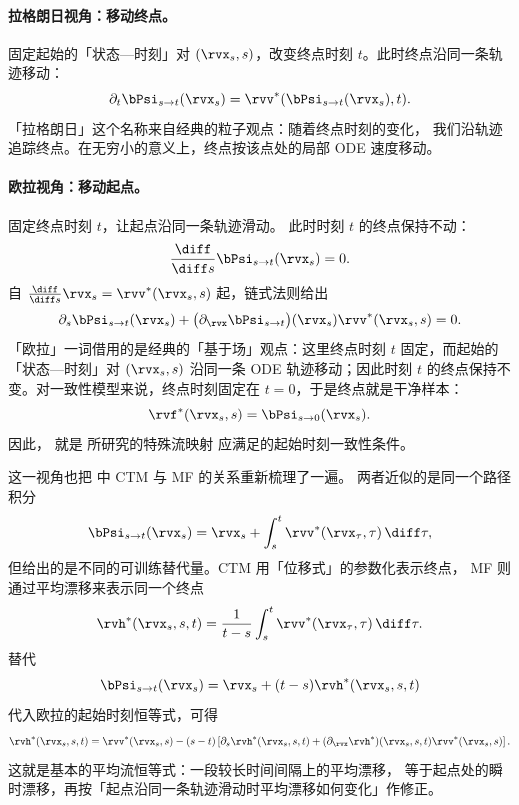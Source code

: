 \paragraph{拉格朗日视角：移动终点。}
固定起始的「状态—时刻」对 $(\rvx_s,s)$，改变终点时刻
$t$。此时终点沿同一条轨迹移动：
\[
\partial_t \bPsi_{s\to t}(\rvx_s)
=
\rvv^*(\bPsi_{s\to t}(\rvx_s),t).
\]
「拉格朗日」这个名称来自经典的粒子观点：随着终点时刻的变化，
我们沿轨迹追踪终点。在无穷小的意义上，终点按该点处的局部 ODE 速度移动。

\paragraph{欧拉视角：移动起点。}
固定终点时刻 $t$，让起点沿同一条轨迹滑动。
此时时刻 $t$ 的终点保持不动：
\[
\frac{\diff}{\diff s}\bPsi_{s\to t}(\rvx_s)=0.
\]
自 $\frac{\diff}{\diff s}\rvx_s=\rvv^*(\rvx_s,s)$ 起，链式法则给出
\[
\partial_s\bPsi_{s\to t}(\rvx_s)
+
\big(\partial_{\rvx}\bPsi_{s\to t}\big)(\rvx_s)\rvv^*(\rvx_s,s)
=
0.
\]
「欧拉」一词借用的是经典的「基于场」观点：这里终点时刻 $t$
固定，而起始的「状态—时刻」对 $(\rvx_s,s)$ 沿同一条 ODE 轨迹移动；因此时刻 $t$ 的终点保持不变。对一致性模型来说，终点时刻固定在 $t=0$，于是终点就是干净样本：
\[
    \rvf^*(\rvx_s,s)=\bPsi_{s\to0}(\rvx_s).
\]
因此， 就是  所研究的特殊流映射
应满足的起始时刻一致性条件。


这一视角也把  中 CTM 与 MF 的关系重新梳理了一遍。
两者近似的是同一个路径积分
\[
\bPsi_{s\to t}(\rvx_s)
=
\rvx_s+\int_s^t\rvv^*(\rvx_\tau,\tau)\,\diff\tau,
\]
但给出的是不同的可训练替代量。CTM 用「位移式」的参数化表示终点，
MF 则通过平均漂移来表示同一个终点
\[
\rvh^*(\rvx_s,s,t)
=
\frac{1}{t-s}\int_s^t\rvv^*(\rvx_\tau,\tau)\,\diff\tau.
\]
替代
\[
\bPsi_{s\to t}(\rvx_s)=\rvx_s+(t-s)\rvh^*(\rvx_s,s,t)
\]
代入欧拉的起始时刻恒等式，可得
\[
\rvh^*(\rvx_s,s,t)
=
\rvv^*(\rvx_s,s)
-
(s-t)
\left[
\partial_s\rvh^*(\rvx_s,s,t)
+
(\partial_{\rvx}\rvh^*)(\rvx_s,s,t)\rvv^*(\rvx_s,s)
\right].
\]
这就是基本的平均流恒等式：一段较长时间间隔上的平均漂移，
等于起点处的瞬时漂移，再按「起点沿同一条轨迹滑动时平均漂移如何变化」作修正。

